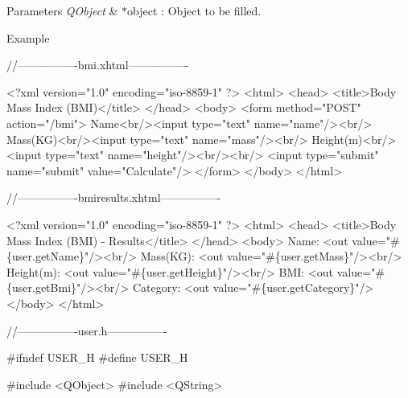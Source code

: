 \begin{DoxyParams}{Parameters}
{\em Q\+Object} & $\ast$object \+: Object to be filled. \\
\hline
\end{DoxyParams}
\begin{DoxyParagraph}{Example}

\begin{DoxyCode}
\textcolor{comment}{//----------------bmi.xhtml----------------}

<?xml version=\textcolor{stringliteral}{"1.0"} encoding=\textcolor{stringliteral}{"iso-8859-1"} ?>
<html>
     <head>
         <title>Body Mass Index (BMI)</title>
     </head>
     <body>
         <form method=\textcolor{stringliteral}{"POST"} action=\textcolor{stringliteral}{"/bmi"}>
             Name<br/><input type=\textcolor{stringliteral}{"text"} name=\textcolor{stringliteral}{"name"}/><br/>
             Mass(KG)<br/><input type=\textcolor{stringliteral}{"text"} name=\textcolor{stringliteral}{"mass"}/><br/>
             Height(m)<br/><input type=\textcolor{stringliteral}{"text"} name=\textcolor{stringliteral}{"height"}/><br/><br/>
             <input type=\textcolor{stringliteral}{"submit"} name=\textcolor{stringliteral}{"submit"} value=\textcolor{stringliteral}{"Calculate"}/>
         </form>
     </body>
 </html>

\textcolor{comment}{//----------------bmiresults.xhtml----------------}

<?xml version=\textcolor{stringliteral}{"1.0"} encoding=\textcolor{stringliteral}{"iso-8859-1"} ?>
<html>
     <head>
         <title>Body Mass Index (BMI) - Results</title>
     </head>
     <body>
         Name: <out value=\textcolor{stringliteral}{"#\{user.getName\}"}/><br/>
         Mass(KG): <out value=\textcolor{stringliteral}{"#\{user.getMass\}"}/><br/>
         Height(m): <out value=\textcolor{stringliteral}{"#\{user.getHeight\}"}/><br/>
         BMI: <out value=\textcolor{stringliteral}{"#\{user.getBmi\}"}/><br/>
         Category: <out value=\textcolor{stringliteral}{"#\{user.getCategory\}"}/>
     </body>
</html>

\textcolor{comment}{//----------------user.h----------------}

#ifndef USER\_H
#define USER\_H

#include <QObject>
#include <QString>


\end{DoxyCode}
\end{DoxyParagraph}
